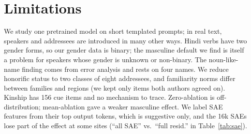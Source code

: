 \documentclass[11pt]{article}
\begin{document}
\section*{Limitations}

We study one pretrained model on short templated prompts; in real text, speakers and addressees are introduced in many other ways. Hindi verbs have two gender forms, so our gender data is binary; the masculine default we find is itself a problem for speakers whose gender is unknown or non-binary. The noun-like-name finding comes from error analysis and rests on four names. We reduce honorific status to two classes of eight addressees, and familiarity norms differ between families and regions (we kept only items both authors agreed on). Kinship has 156 cue items and no mechanism to trace. Zero-ablation is off-distribution; mean-ablation gave a weaker masculine effect. We label SAE features from their top output tokens, which is suggestive only, and the 16k SAEs lose part of the effect at some sites (``all SAE'' vs.\ ``full resid.'' in Table~\ref{tab:sae}).


\end{document}

